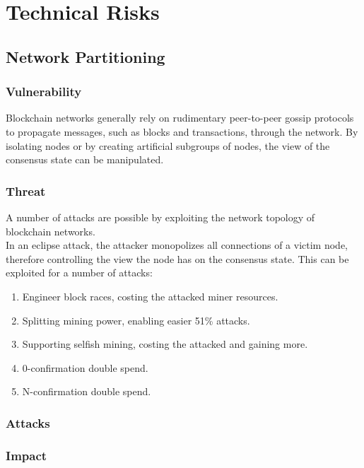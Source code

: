 \documentclass[11pt,a4paper,draft]{article}
\begin{document}
\section{Technical Risks}

\subsection{Network Partitioning}

\subsubsection{Vulnerability}

Blockchain networks generally rely on rudimentary peer-to-peer gossip protocols to propagate messages, such as blocks and transactions, through the network. By isolating nodes or by creating artificial subgroups of nodes, the view of the consensus state can be manipulated.\\

\subsubsection{Threat}

A number of attacks are possible by exploiting the network topology of blockchain networks.\\

In an eclipse attack, the attacker monopolizes all connections of a victim node, therefore controlling the view the node has on the consensus state. This can be exploited for a number of attacks:\\
\begin{enumerate}
  \item Engineer block races, costing the attacked miner resources.
  \item Splitting mining power, enabling easier 51\% attacks.
  \item Supporting selfish mining, costing the attacked and gaining more.
  \item 0-confirmation double spend.
  \item N-confirmation double spend.
\end{enumerate}

\subsubsection{Attacks}

\subsubsection{Impact}
\end{document}
